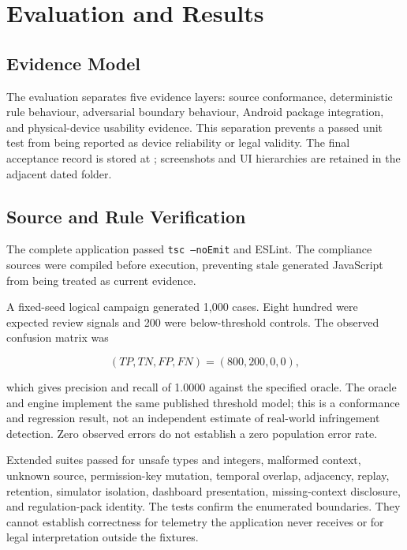\section{Evaluation and Results}

\subsection{Evidence Model}

The evaluation separates five evidence layers: source conformance, deterministic rule behaviour, adversarial boundary behaviour, Android package integration, and physical-device usability evidence. This separation prevents a passed unit test from being reported as device reliability or legal validity. The final acceptance record is stored at ; screenshots and UI hierarchies are retained in the adjacent dated folder.

\subsection{Source and Rule Verification}

The complete application passed \texttt{tsc --noEmit} and ESLint. The compliance sources were compiled before execution, preventing stale generated JavaScript from being treated as current evidence.

A fixed-seed logical campaign generated 1,000 cases. Eight hundred were expected review signals and 200 were below-threshold controls. The observed confusion matrix was

\begin{equation}
(TP,TN,FP,FN)=(800,200,0,0),
\end{equation}

which gives precision and recall of 1.0000 against the specified oracle. The oracle and engine implement the same published threshold model; this is a conformance and regression result, not an independent estimate of real-world infringement detection. Zero observed errors do not establish a zero population error rate.

Extended suites passed for unsafe types and integers, malformed context, unknown source, permission-key mutation, temporal overlap, adjacency, replay, retention, simulator isolation, dashboard presentation, missing-context disclosure, and regulation-pack identity. The tests confirm the enumerated boundaries. They cannot establish correctness for telemetry the application never receives or for legal interpretation outside the fixtures.


